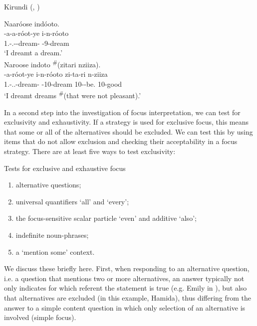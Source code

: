 \documentclass[output=paper]{langscibook}
\begin{document}
\ea
\label{bkm:Ref118879810}Kirundi (, \cite{chapters/kirundi})
\begin{xlist}
\exi{\DJ}
\label{bkm:Ref118879810:a}
Naaróose indóoto.\\
\gll
\N{}-a-a-róot-ye  i-n-róoto\\
1\SG.\SM-\N.\PST-\DJ{}-dream-\PFV{}  \AUG{}-9-dream\\
\glt
‘I dreamt a dream.’\\

\exi{\CJ}
\label{bkm:Ref118879810:b}
Naroose indoto \textsuperscript{\#}(zitari nziiza).\\
\gll
\N{}-a-róot-ye  i-n-róoto  zi-ta-ri  n-ziiza\\
1\SG.\SM-\N.\PST.\CJ{}-dream-\PFV{}  \AUG{}-10-dream  10\SM-\NEG{}-be.\REL{}  10-good\\
\glt
‘I dreamt dreams \textsuperscript{\#}(that were not pleasant).’\\

\end{xlist}
\z
\largerpage

In a second step into the investigation of focus interpretation, we can test for exclusivity and exhaustivity. If a strategy is used for exclusive focus, this means that some or all of the alternatives should be excluded. We can test this by using items that do not allow exclusion and checking their acceptability in a focus strategy. There are at least five ways to test exclusivity: 

\ea
Tests for exclusive and exhaustive focus
\begin{enumerate}
    \item alternative questions;
\item  universal quantifiers ‘all’ and ‘every’;
\item  the focus-sensitive scalar particle ‘even’ and additive ‘also’;
\item   indefinite noun-phrases;
\item  a ‘mention some’ context.
\end{enumerate}
\z

We discuss these briefly here. First, when responding to an alternative question, i.e. a question that mentions two or more alternatives, an answer typically not only indicates for which referent the statement is true (e.g. Emily in ), but also that alternatives are excluded (in this example, Hamida), thus differing from the answer to a simple content question in which only selection of an alternative is involved (simple focus).
\end{document}
